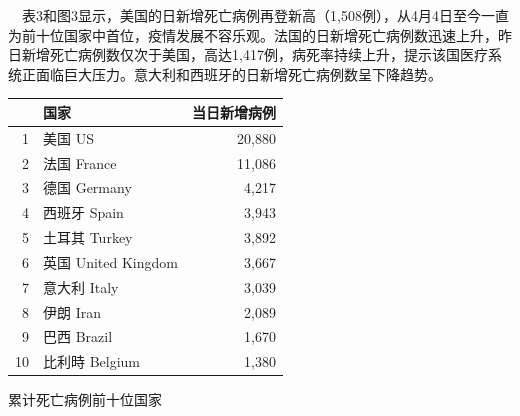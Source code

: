 \documentclass[]{article}
\begin{document}
\(\quad\)表3和图3显示，美国的日新增死亡病例再登新高（1,508例），从4月4日至今一直为前十位国家中首位，疫情发展不容乐观。法国的日新增死亡病例数迅速上升，昨日新增死亡病例数仅次于美国，高达1,417例，病死率持续上升，提示该国医疗系统正面临巨大压力。意大利和西班牙的日新增死亡病例数呈下降趋势。

\begin{table}[H]
  \vspace{-7mm}
    \caption{日新增病例前十位国家}
      \vspace{-0.5\baselineskip}
      \centering \begin{table}[H]
\centering\begingroup\fontsize{18}{20}\selectfont

\begin{tabular}{rlr}
\toprule
  & 国家 & 当日新增病例\\
\midrule
\rowcolor{gray!6}  1 & 美国 US & 20,880\\
2 & 法国 France & 11,086\\
\rowcolor{gray!6}  3 & 德国 Germany & 4,217\\
4 & 西班牙 Spain & 3,943\\
\rowcolor{gray!6}  5 & 土耳其 Turkey & 3,892\\
6 & 英国 United Kingdom & 3,667\\
\rowcolor{gray!6}  7 & 意大利 Italy & 3,039\\
8 & 伊朗 Iran & 2,089\\
\rowcolor{gray!6}  9 & 巴西 Brazil & 1,670\\
10 & 比利時 Belgium & 1,380\\
\bottomrule
\end{tabular}
\endgroup{}
\end{table} \end{table}\begin{table}[H]
  \vspace{-7mm}
    \caption{累计死亡病例前十位国家}
      \vspace{-0.5\baselineskip}
      \centering \begin{table}[H]
\centering\begingroup\fontsize{18}{20}\selectfont


\end{table}
\end{table}
\end{document}
